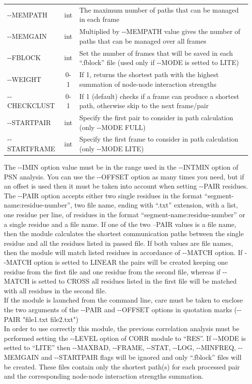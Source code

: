 \documentclass[11pt,twoside,onecolumn,a4paper,openright,notitlepage]{book}[2001/04/21]
\begin{document}
\begin{longtable}{l|c|p{7.0cm}}
-{}-MEMPATH       & int            & The maximum number of paths that can be managed in each frame\\
-{}-MEMGAIN       & int            & Multiplied by -{}-MEMPATH value gives the number of paths that can be managed over all frames\\
-{}-FBLOCK        & int            & Set the number of frames that will be saved in each ``.fblock'' file (used only if -{}-MODE is setted to LITE)\\
-{}-WEIGHT        & 0-1            & If 1, returns the shortest path with the highest summation of node-node interaction strengths\\
-{}-CHECKCLUST    & 0-1            & If 1 (default) checks if a frame can produce a shortest path, otherwise skip to the next frame/pair\\
-{}-STARTPAIR     & int            & Specify the first pair to consider in path calculation (only -{}-MODE FULL)\\
-{}-STARTFRAME    & int            & Specify the first frame to consider in path calculation (only -{}-MODE LITE)\\
\end{longtable}

The -{}-IMIN option value must be in the range used in the -{}-INTMIN option of PSN analysis. You can use the -{}-OFFSET option as many
times you need, but if an offset is used then it must be taken into account when setting -{}-PAIR residues. The -{}-PAIR option accepts
either two single residues in the format ``segment-name:residue-number'', two file name, ending with ``.txt'' extension, with a list, one residue
per line, of residues in the format ``segment-name:residue-number'' or a single residue and a file name. If one of the two --PAIR values is a file
name, then the module calculates the shortest communication paths between the single residue and all the residues listed in passed file. If both
values are file names, then the module will match listed residues in accordance of -{}-MATCH option. If -{}-MATCH option is setted to LINEAR the
pairs will be created keeping one residue from the first file and one residue from the second file, whereas if -{}-MATCH is setted to CROSS all
residues listed in the first file will be matched with all residues in the second file.\\
If the module is launched from the command line, care must be taken to enclose the two arguments of the -{}-PAIR and -{}-OFFSET options in quotation marks (-{}-PAIR "file1.txt file2.txt")\\
In order to use correctly this module, the previous
correlation analysis must be performed setting the -{}-LEVEL option of CORR module to ``RES''. If -{}-MODE is setted to ``LITE'' then
-{}-MAXBAD, -{}-FRAME, -{}-STAT, -{}-LOG, -{}-MINFREQ, -{}-MEMGAIN and -{}-STARTPAIR flags will be ignored and only ``.fblock'' files will be created. These files
contain only the shortest path(s) for each processed pair and the corresponding node-node interaction strengths summation.\\
\end{document}
